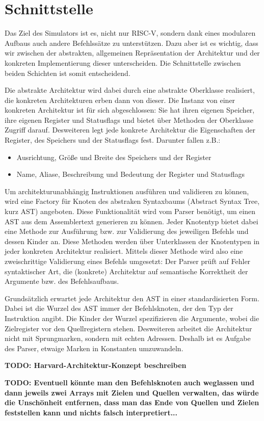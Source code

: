 \section{Schnittstelle}

Das Ziel des Simulators ist es, nicht nur RISC-V, sondern dank eines modularen Aufbaus auch andere Befehlssätze zu unterstützen. Dazu aber ist es wichtig, dass wir zwischen der abstrakten, allgemeinen Repräsentation der Architektur und der konkreten Implementierung dieser unterscheiden. Die Schnittstelle zwischen beiden Schichten ist somit entscheidend.

Die abstrakte Architektur wird dabei durch eine abstrakte Oberklasse realisiert, die konkreten Architekturen erben dann von dieser. Die Instanz von einer konkreten Architektur ist für sich abgeschlossen: Sie hat ihren eigenen Speicher, ihre eigenen Register und Statusflags und bietet über Methoden der Oberklasse Zugriff darauf. Desweiteren legt jede konkrete Architektur die Eigenschaften der Register, des Speichers und der Statusflags fest. Darunter fallen z.B.:

\begin{itemize}
\item Ausrichtung, Größe und Breite des Speichers und der Register
\item Name, Aliase, Beschreibung und Bedeutung der Register und Statusflags
\end{itemize}

Um architekturunabhängig Instruktionen ausführen und validieren zu können, wird eine Factory für Knoten des abstraken Syntaxbaums (Abstract Syntax Tree, kurz AST) angeboten. Diese Funktionalität wird vom Parser benötigt, um einen AST aus dem Assemblertext generieren zu können. Jeder Knotentyp bietet dabei eine Methode zur Ausführung bzw. zur Validierung des jeweiligen Befehls und dessen Kinder an. Diese Methoden werden über Unterklassen der Knotentypen in jeder konkreten Architektur realisiert. Mittels dieser Methode wird also eine zweischrittige Validierung eines Befehls umgesetzt: Der Parser prüft auf Fehler syntaktischer Art, die (konkrete) Architektur auf semantische Korrektheit der Argumente bzw. des Befehlsaufbaus.

Grundsätzlich erwartet jede Architektur den AST in einer standardisierten Form. Dabei ist die Wurzel des AST immer der Befehlsknoten, der den Typ der Instruktion angibt. Die Kinder der Wurzel spezifizieren die Argumente, wobei die Zielregister vor den Quellregistern stehen. Desweiteren arbeitet die Architektur nicht mit Sprungmarken, sondern mit echten Adressen. Deshalb ist es Aufgabe des Parser, etwaige Marken in Konstanten umzuwandeln.

\textbf{TODO: Harvard-Architektur-Konzept beschreiben}

\textbf{TODO: Eventuell könnte man den Befehlsknoten auch weglassen und dann jeweils zwei Arrays mit Zielen und Quellen verwalten, das würde die Unschönheit entfernen, dass man das Ende von Quellen und Zielen feststellen kann und nichts falsch interpretiert...}